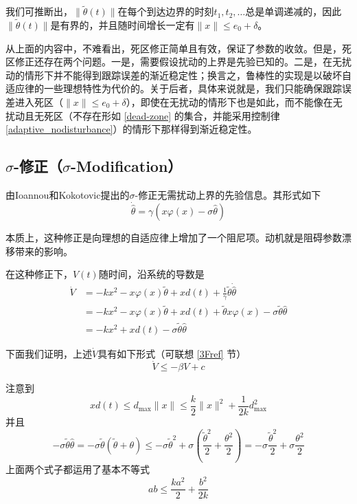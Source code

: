 我们可推断出，\(\| \tilde{\theta}(t) \|\)在每个到达边界的时刻\(t_{1},t_{2},\ldots\)总是单调递减的，因此\(\| \tilde{\theta}(t) \|\)是有界的，并且随时间增长一定有\(\| x \| \leq e_{0} + \delta\)。

从上面的内容中，不难看出，死区修正简单且有效，保证了参数的收敛。但是，死区修正还存在两个问题。一是，需要假设扰动的上界是先验已知的。二是，在无扰动的情形下并不能得到跟踪误差的渐近稳定性；换言之，鲁棒性的实现是以破坏自适应律的一些理想特性为代价的。关于后者，具体来说就是，我们只能确保跟踪误差进入死区（$\| x \| \leq e_0 + \delta$），即使在无扰动的情形下也是如此，而不能像在无扰动且无死区（不存在形如 \eqref{dead-zone} 的集合，并能采用控制律 \eqref{adaptive_nodisturbance}）的情形下那样得到渐近稳定性。

\subsection{\texorpdfstring{$\sigma$-修正（$\sigma$-Modification）}{σ-修正（σ-Modification）}}
由Ioannou和Kokotovic提出的$\sigma$-修正无需扰动上界的先验信息。其形式如下
\begin{equation} \label{sigma_modification}
    \dot{\hat{\theta}} = \gamma(x\varphi(x) - \sigma\hat{\theta})
\end{equation}

本质上，这种修正是向理想的自适应律上增加了一个阻尼项。动机就是阻碍参数漂移带来的影响。

在这种修正下，\(V(t)\)随时间，沿系统的导数是
\[\begin{aligned}
\dot{V} & = - kx^{2} - x\varphi(x)\tilde{\theta} + xd(t) + \frac{1}{\gamma}\tilde{\theta}\dot{\hat{\theta}} \\
 & = - kx^{2} - x\varphi(x)\tilde{\theta} + xd(t) + \tilde{\theta}x\varphi(x) - \sigma\tilde{\theta}\hat{\theta} \\
 & = - kx^{2} + xd(t) - \sigma\tilde{\theta}\hat{\theta} 
\end{aligned}\]

下面我们证明，上述$\dot{V}$具有如下形式（可联想 \ref{3Fref} 节）
\[\dot{V} \le - \beta V + c\]

注意到\begin{equation}
    xd(t) \leq d_{\max} \| x \| \leq \frac{k}{2}\| x \|^{2} + \frac{1}{2k}d_{\max}^{2}\label{temp_neq1}
\end{equation}
并且\begin{equation}
    - \sigma\tilde{\theta}\hat{\theta} = - \sigma\tilde{\theta}(\tilde{\theta} + \theta)
    \leq - \sigma{\tilde{\theta}}^{2} + \sigma\left(\frac{{\tilde{\theta}}^{2}}{2} + \frac{\theta^{2}}{2}\right)
    = - \sigma\frac{{\tilde{\theta}}^{2}}{2} + \sigma\frac{\theta^{2}}{2}\label{temp_neq2}
\end{equation}
上面两个式子都运用了基本不等式\[ab \leq \frac{ka^{2}}{2} + \frac{b^{2}}{2k}\]

